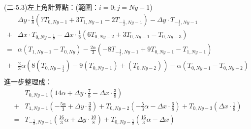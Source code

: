 \documentclass[12pt]{article}
\begin{document}
\noindent (二-5.3)左上角計算點：(範圍：$i = 0 ; j = Ny-1$)\\
\begin{equation}
  \begin{split}
    &\Delta y \cdot \frac{1}{8}\left(7T_{0,Ny-1}+3T_{1,Ny-1}-2T_{-\frac{1}{2},Ny-1}\right) - \Delta y \cdot T_{-\frac{1}{2},Ny-1}\\
  + &\Delta x \cdot T_{0,Ny-\frac{1}{2}}- \Delta x \cdot \frac{1}{8}\left(6T_{0,Ny-2}+3T_{0,Ny-1}-T_{0,Ny-3}\right) \\
  = & \alpha (T_{1,Ny-1}-T_{0,Ny})-  \frac{2\alpha}{3} (-8T_{-\frac{1}{2},Ny-1}+9T_{0,Ny-1}-T_{1,Ny-1})\\
  + & \frac{2}{3} \alpha (8(T_{0,Ny-\frac{1}{2}})-9(T_{0,Ny-1})+(T_{0,Ny-2})) -  \alpha (T_{0,Ny-1}-T_{0,Ny-2}) \\
\end{split}
\end{equation}
\noindent 進一步整理成：
\begin{equation}
\begin{split}
  &T_{0,Ny-1}(14\alpha+\Delta y \cdot \frac{7}{8}- \Delta x \cdot \frac{3}{8})\\
  + &T_{1,Ny-1}(-  \frac{5\alpha}{3}+\Delta y \cdot \frac{3}{8}) + T_{0,Ny-2}(-\frac{5}{3} \alpha- \Delta x \cdot \frac{6}{8}) + T_{0,Ny-3}( \Delta x \cdot \frac{1}{8}) \\
  = &T_{-\frac{1}{2},Ny-1}(\frac{16}{3} \alpha +\Delta y \cdot \frac{10}{8}) + T_{0,Ny-\frac{1}{2}}(\frac{16}{3} \alpha -\Delta x)
\end{split}
\end{equation}
\end{document}
